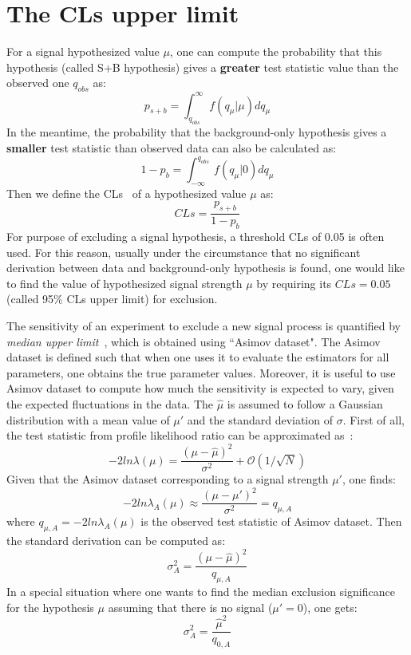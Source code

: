 \section{The CLs upper limit}
\label{sec:CLs}

For a signal hypothesized value $\mu$, one can compute the probability that this hypothesis (called S+B hypothesis) gives a \textbf{greater} test statistic value than the observed one $q_{obs}$ as:
\begin{equation}
    p_{s+b} = \int_{q_{obs}}^{\infty} f(q_{\mu}|\mu) d q_{\mu}
\end{equation}
In the meantime, the probability that the background-only hypothesis gives a \textbf{smaller} test statistic than observed data can also be calculated as:
\begin{equation}
    1 - p_{b} = \int_{-\infty}^{q_{obs}} f(q_{\mu}|0) d q_{\mu}
\end{equation}
Then we define the CLs~\cite{Read_2002} of a hypothesized value $\mu$ as:
\begin{equation}
    CLs = \frac{p_{s+b}}{1-p_{b}}
\end{equation}
For purpose of excluding a signal hypothesis, a threshold CLs of 0.05 is often used.
For this reason, usually under the circumstance that no significant derivation between data and background-only hypothesis is found,
one would like to find the value of hypothesized signal strength $\mu$ by requiring its $CLs = 0.05$ (called 95\% CLs upper limit) for exclusion. 

The sensitivity of an experiment to exclude a new signal process is quantified by \textit{median upper limit}~\cite{Bellos:2725027},
which is obtained using ``Asimov dataset".
The Asimov dataset is defined such that when one uses it to evaluate the estimators for all parameters, one obtains the true parameter values.
Moreover, it is useful to use Asimov dataset to compute how much the sensitivity is expected to vary, given the expected fluctuations in the data.
The $\hat{\mu}$ is assumed to follow a Gaussian distribution with a mean value of $\mu '$ and the standard deviation of $\sigma$.
First of all, the test statistic from profile likelihood ratio can be approximated as~\cite{Cowan:2010js}:
\begin{equation}
	-2 ln \lambda(\mu) = \frac{(\mu - \hat{\mu})^2}{\sigma^2} + \mathcal{O}(1/\sqrt{N})
\end{equation}
Given that the Asimov dataset corresponding to a signal strength $\mu'$, one finds:
\begin{equation}
	-2 ln \lambda_{A}(\mu) \approx \frac{(\mu - \mu')^2}{\sigma^2} = q_{\mu,A}
\end{equation}
where $q_{\mu,A} = -2ln\lambda_{A}(\mu)$ is the observed test statistic of Asimov dataset.
Then the standard derivation can be computed as:
\begin{equation}
	\sigma_A^2 = \frac{(\mu - \hat{\mu})^2}{q_{\mu,A}}
\end{equation}
In a special situation where one wants to find the median exclusion significance for the hypothesis $\mu$ assuming that there is no signal ($\mu' = 0$),
one gets:
\begin{equation}
        \sigma_A^2 = \frac{\hat{\mu}^2}{q_{0,A}}
\end{equation}
